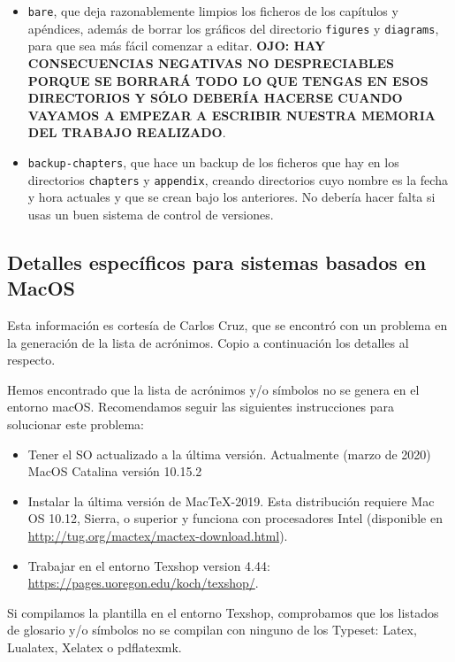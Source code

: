 \documentclass[spanish,openright]{book}
\begin{document}
\begin{itemize}
\begin{itemize}
\item \texttt{bare}, que deja razonablemente limpios los ficheros de
los capítulos y apéndices, además de borrar los gráficos del
directorio \texttt{figures} y \texttt{diagrams}, para que sea más
fácil comenzar a editar. \textbf{OJO: HAY CONSECUENCIAS NEGATIVAS NO
DESPRECIABLES PORQUE SE BORRARÁ TODO LO QUE TENGAS EN ESOS
DIRECTORIOS Y SÓLO DEBERÍA HACERSE CUANDO VAYAMOS A EMPEZAR A
ESCRIBIR NUESTRA MEMORIA DEL TRABAJO REALIZADO}.

\item \texttt{backup-chapters}, que hace un backup de los ficheros que
hay en los directorios \texttt{chapters} y \texttt{appendix},
creando directorios cuyo nombre es la fecha y hora actuales y que se
crean bajo los anteriores. No debería hacer falta si usas un buen
sistema de control de versiones.
\end{itemize}

\end{itemize}


\subsection{Detalles específicos para sistemas basados en MacOS}
\label{sec:detall-espec-para}

Esta información es cortesía de Carlos Cruz, que se encontró con un
problema en la generación de la lista de acrónimos. Copio a
continuación los detalles al respecto.

Hemos encontrado que la lista de acrónimos y/o símbolos no se genera en
el entorno macOS. Recomendamos seguir las siguientes instrucciones para
solucionar este problema:

\begin{itemize}
\item Tener el SO actualizado a la última versión. Actualmente (marzo de
2020) MacOS Catalina versión 10.15.2
\item Instalar la última versión de MacTeX-2019. Esta distribución
requiere Mac OS 10.12, Sierra, o superior y funciona con procesadores
Intel (disponible en
\href{http://tug.org/mactex/mactex-download.html}{http://tug.org/mactex/mactex-download.html}).
\item Trabajar en el entorno Texshop version 4.44:
\href{https://pages.uoregon.edu/koch/texshop/}{https://pages.uoregon.edu/koch/texshop/}.
\end{itemize}

Si compilamos la plantilla en el entorno Texshop, comprobamos que los
listados de glosario y/o símbolos no se compilan con ninguno de los
Typeset: Latex, Lualatex, Xelatex o pdflatexmk.
\end{document}
